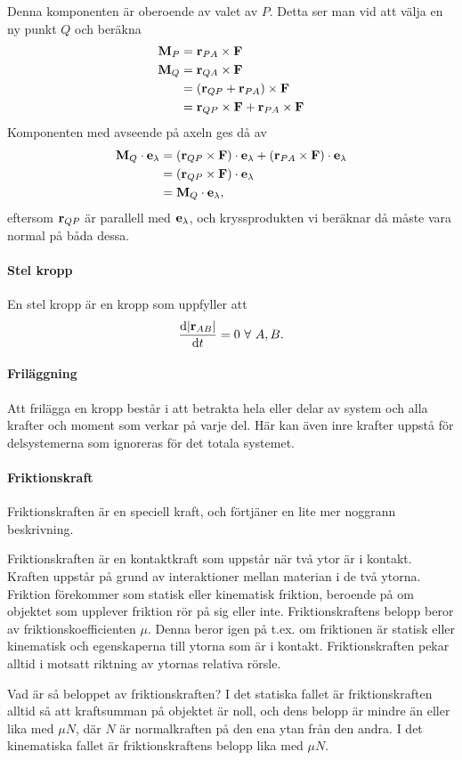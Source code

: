 Denna komponenten är oberoende av valet av $P$. Detta ser man vid att välja en ny punkt $Q$ och beräkna
\begin{align*}
	\vect{M}_P &= \vect{r}_{PA}\times\vect{F} \\
	\vect{M}_Q &= \vect{r}_{QA}\times\vect{F} \\
	           &= (\vect{r}_{QP} + \vect{r}_{PA})\times\vect{F} \\
	           &= \vect{r}_{QP}\times\vect{F} + \vect{r}_{PA}\times\vect{F}
\end{align*}
Komponenten med avseende på axeln ges då av
\begin{align*}
	\vect{M}_Q\cdot\vect{e}_\lambda &= (\vect{r}_{QP}\times\vect{F})\cdot\vect{e}_\lambda + (\vect{r}_{PA}\times\vect{F})\cdot\vect{e}_\lambda \\
	                                &= (\vect{r}_{QP}\times\vect{F})\cdot\vect{e}_\lambda \\
	                                &= \vect{M}_Q\cdot\vect{e}_\lambda,
\end{align*}
eftersom $\vect{r}_{QP}$ är parallell med $\vect{e}_\lambda$, och kryssprodukten vi beräknar då måste vara normal på båda dessa.

\paragraph{Stel kropp}
En stel kropp är en kropp som uppfyller att
\begin{align*}
	\dv{\abs{\vect{r}_{AB}}}{t} = 0\ \forall\ A, B. 
\end{align*}

\paragraph{Friläggning}
Att frilägga en kropp består i att betrakta hela eller delar av system och alla krafter och moment som verkar på varje del. Här kan även inre krafter uppstå för delsystemerna som ignoreras för det totala systemet.

\paragraph{Friktionskraft}
Friktionskraften är en speciell kraft, och förtjäner en lite mer noggrann beskrivning.

Friktionskraften är en kontaktkraft som uppstår när två ytor är i kontakt. Kraften uppstår på grund av interaktioner mellan materian i de två ytorna. Friktion förekommer som statisk eller kinematisk friktion, beroende på om objektet som upplever friktion rör på sig eller inte. Friktionskraftens belopp beror av friktionskoefficienten $\mu$. Denna beror igen på t.ex. om friktionen är statisk eller kinematisk och egenskaperna till ytorna som är i kontakt. Friktionskraften pekar alltid i motsatt riktning av ytornas relativa rörsle.

Vad är så beloppet av friktionskraften? I det statiska fallet är friktionskraften alltid så att kraftsumman på objektet är noll, och dens belopp är mindre än eller lika med $\mu N$, där $N$ är normalkraften på den ena ytan från den andra. I det kinematiska fallet är friktionskraftens belopp lika med $\mu N$.